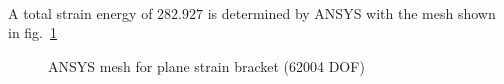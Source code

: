 \paragraph{}
A total strain energy of $282.927$ is determined by ANSYS with the mesh shown in fig.~\ref{qdt_fig:ex_bracket_ansys_mesh}
    \begin{figure}[H]
        \centering
        \caption{ANSYS mesh for plane strain bracket (62004 DOF)}
        \label{qdt_fig:ex_bracket_ansys_mesh}
    \end{figure}


